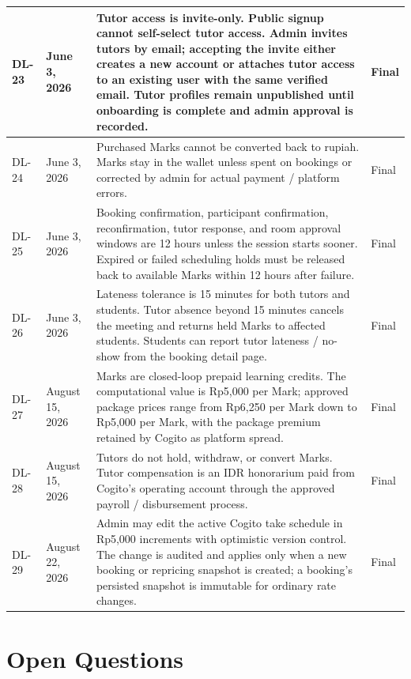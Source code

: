 \documentclass[11pt,a4paper]{article}
\begin{document}
\begin{longtable}{|L{1.6cm}|L{2.1cm}|L{8.6cm}|L{2.1cm}|}
\hline
DL-23 & June 3, 2026 & Tutor access is invite-only. Public signup cannot self-select tutor access. Admin invites tutors by email; accepting the invite either creates a new account or attaches tutor access to an existing user with the same verified email. Tutor profiles remain unpublished until onboarding is complete and admin approval is recorded. & Final \\
\hline
DL-24 & June 3, 2026 & Purchased Marks cannot be converted back to rupiah. Marks stay in the wallet unless spent on bookings or corrected by admin for actual payment / platform errors. & Final \\
\hline
DL-25 & June 3, 2026 & Booking confirmation, participant confirmation, reconfirmation, tutor response, and room approval windows are 12 hours unless the session starts sooner. Expired or failed scheduling holds must be released back to available Marks within 12 hours after failure. & Final \\
\hline
DL-26 & June 3, 2026 & Lateness tolerance is 15 minutes for both tutors and students. Tutor absence beyond 15 minutes cancels the meeting and returns held Marks to affected students. Students can report tutor lateness / no-show from the booking detail page. & Final \\
\hline
DL-27 & August 15, 2026 & Marks are closed-loop prepaid learning credits. The computational value is Rp5,000 per Mark; approved package prices range from Rp6,250 per Mark down to Rp5,000 per Mark, with the package premium retained by Cogito as platform spread. & Final \\
\hline
DL-28 & August 15, 2026 & Tutors do not hold, withdraw, or convert Marks. Tutor compensation is an IDR honorarium paid from Cogito's operating account through the approved payroll / disbursement process. & Final \\
\hline
DL-29 & August 22, 2026 & Admin may edit the active Cogito take schedule in Rp5,000 increments with optimistic version control. The change is audited and applies only when a new booking or repricing snapshot is created; a booking's persisted snapshot is immutable for ordinary rate changes. & Final \\
\hline
\end{longtable}
\normalsize

\section{Open Questions}
\end{document}
